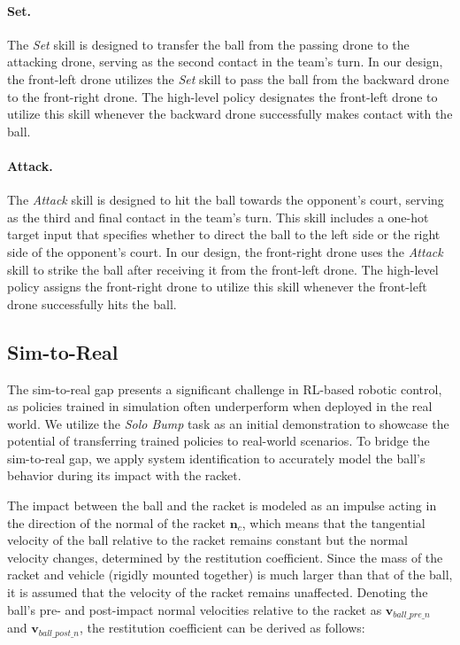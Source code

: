 \paragraph{Set.}
The \textit{Set} skill is designed to transfer the ball from the passing drone to the attacking drone, serving as the second contact in the team’s turn. In our design, the front-left drone utilizes the \textit{Set} skill to pass the ball from the backward drone to the front-right drone. The high-level policy designates the front-left drone to utilize this skill whenever the backward drone successfully makes contact with the ball.

\paragraph{Attack.}
The \textit{Attack} skill is designed to hit the ball towards the opponent’s court, serving as the third and final contact in the team’s turn. This skill includes a one-hot target input that specifies whether to direct the ball to the left side or the right side of the opponent’s court. In our design, the front-right drone uses the \textit{Attack} skill to strike the ball after receiving it from the front-left drone. The high-level policy assigns the front-right drone to utilize this skill whenever the front-left drone successfully hits the ball.


\subsection{Sim-to-Real}

The sim-to-real gap presents a significant challenge in RL-based robotic control, as policies trained in simulation often underperform when deployed in the real world. We utilize the \textit{Solo Bump} task as an initial demonstration to showcase the potential of transferring trained policies to real-world scenarios. To bridge the sim-to-real gap, we apply system identification to accurately model the ball's behavior during its impact with the racket.

The impact between the ball and the racket is modeled as an impulse acting in the direction of the normal of the racket $\bm{n}_c$, which means that the tangential velocity of the ball relative to the racket remains constant but the normal velocity changes, determined by the restitution coefficient. Since the mass of the racket and vehicle (rigidly mounted together) is much larger than that of the ball, it is assumed that the velocity of the racket remains unaffected. 
Denoting the ball's pre- and post-impact normal velocities relative to the racket as $\bm{v}_{ball\_pre\_n}$ and $\bm{v}_{ball\_post\_n}$, the restitution coefficient can be derived as follows:

